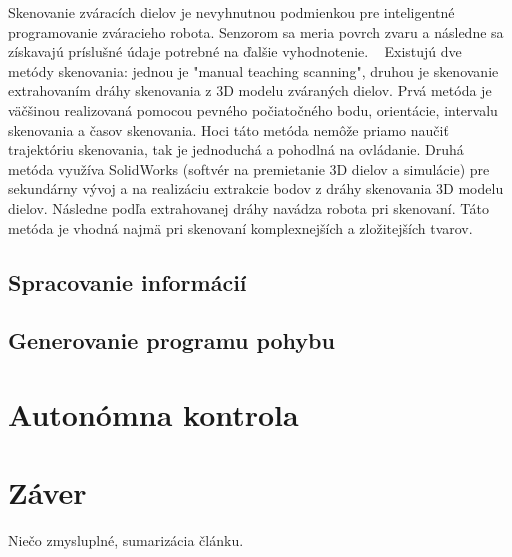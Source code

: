 \documentclass[10pt,twoside,slovak,a4paper]{article}
\begin{document}
Skenovanie zváracích dielov je nevyhnutnou podmienkou pre inteligentné programovanie zváracieho robota. Senzorom sa meria povrch zvaru a následne sa získavajú príslušné údaje potrebné na ďalšie vyhodnotenie. ~\cite{hlavny_zdroj} Existujú dve metódy skenovania: jednou je "manual teaching scanning", druhou je skenovanie extrahovaním dráhy skenovania z 3D modelu zváraných dielov. Prvá metóda je väčšinou realizovaná pomocou pevného počiatočného bodu, orientácie, intervalu skenovania a časov skenovania. Hoci táto metóda nemôže priamo naučiť trajektóriu skenovania, tak je jednoduchá a pohodlná na ovládanie. Druhá metóda využíva SolidWorks (softvér na premietanie 3D dielov a simulácie) pre sekundárny vývoj a na realizáciu extrakcie bodov z dráhy skenovania 3D modelu dielov. Následne podľa extrahovanej dráhy navádza robota pri skenovaní. Táto metóda je vhodná najmä pri skenovaní komplexnejších a zložitejších tvarov. ~\cite{hlavny_zdroj}

\subsection{Spracovanie informácií} \label{AIsys:processinfo} %

\subsection{Generovanie programu pohybu} \label{AIsys:movement} %

\section{Autonómna kontrola} \label{AIcheck} %

\cite{hlavny_zdroj}

\section{Záver} \label{zaver} %

Niečo zmysluplné, sumarizácia článku.

\newpage

 
\end{document}
